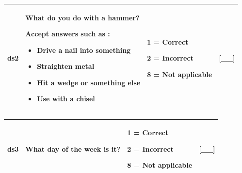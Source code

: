 \documentclass[12pt,a4paper]{book}
\providecommand{\tightlist}{%
  \setlength{\itemsep}{0pt}\setlength{\parskip}{0pt}}
\theoremstyle{definition}
\theoremstyle{definition}
\theoremstyle{definition}
\theoremstyle{remark}
\begin{document}
\begin{longtable}[]{@{}llll@{}}
\toprule
\begin{minipage}[t]{0.24\columnwidth}\raggedright
ds2\strut
\end{minipage} & \begin{minipage}[t]{0.24\columnwidth}\raggedright
What do you do with a hammer?

Accept answers such as :

\begin{itemize}
\tightlist
\item
  Drive a nail into something
\item
  Straighten metal
\item
  Hit a wedge or something else
\item
  Use with a chisel
\end{itemize}\strut
\end{minipage} & \begin{minipage}[t]{0.24\columnwidth}\raggedright
1 = Correct

2 = Incorrect

8 = Not applicable\strut
\end{minipage} & \begin{minipage}[t]{0.24\columnwidth}\raggedright
{[}\_\_{]}\strut
\end{minipage}\tabularnewline
\bottomrule
\end{longtable}

\begin{longtable}[]{@{}llll@{}}
\toprule
\begin{minipage}[t]{0.24\columnwidth}\raggedright
ds3\strut
\end{minipage} & \begin{minipage}[t]{0.24\columnwidth}\raggedright
What day of the week is it?\strut
\end{minipage} & \begin{minipage}[t]{0.24\columnwidth}\raggedright
1 = Correct

2 = Incorrect

8 = Not applicable\strut
\end{minipage} & \begin{minipage}[t]{0.24\columnwidth}\raggedright
{[}\_\_{]}\strut
\end{minipage}\tabularnewline
\bottomrule
\end{longtable}
\end{document}
